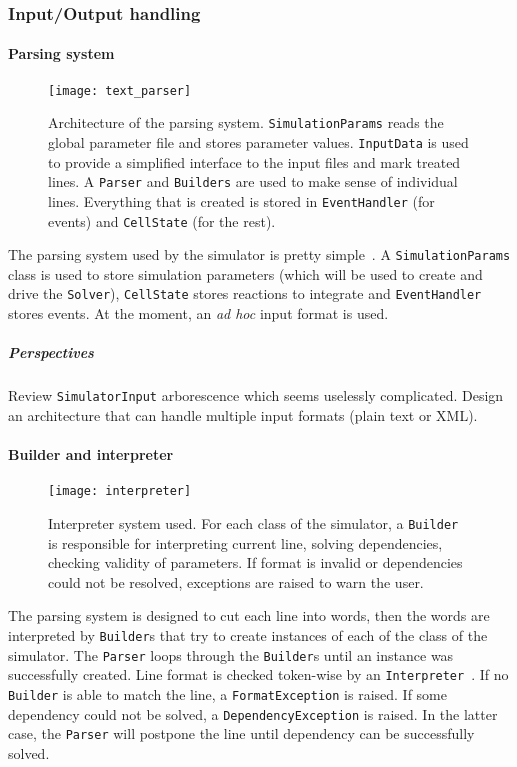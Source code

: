 
\subsubsection{Input/Output handling}

\paragraph{Parsing system}

\begin{figure}[!h]
  \centering
  \texttt{[image: text\_parser]}
  \caption{Architecture of the parsing system. \texttt{SimulationParams} reads the global parameter file and stores parameter values. \texttt{InputData} is used to provide a simplified interface to the input files and mark treated lines. A \texttt{Parser} and \texttt{Builders} are used to make sense of individual lines. Everything that is created is stored in \texttt{EventHandler} (for events) and \texttt{CellState} (for the rest). }
  \label{fig:text_parser}
\end{figure}

The parsing system used by the simulator is pretty simple~. A \texttt{SimulationParams} class is used to store simulation parameters (which will be used to create and drive the \texttt{Solver}), \texttt{CellState} stores reactions to integrate and \texttt{EventHandler} stores events. At the moment, an \textit{ad hoc} input format is used.

\subparagraph{Perspectives} Review \texttt{SimulatorInput} arborescence which seems uselessly complicated. Design an architecture that can handle multiple input formats (plain text or XML).

\paragraph{Builder and interpreter}

\begin{figure}[!h]
  \centering
  \texttt{[image: interpreter]}
  \caption{Interpreter system used. For each class of the simulator, a \texttt{Builder} is responsible for interpreting current line, solving dependencies, checking validity of parameters. If format is invalid or dependencies could not be resolved, exceptions are raised to warn the user.}
  \label{fig:interpreter}
\end{figure}

The parsing system is designed to cut each line into words, then the words are interpreted by \texttt{Builder}s that try to create instances of each of the class of the simulator. The \texttt{Parser} loops through the \texttt{Builder}s until an instance was successfully created. Line format is checked token-wise by an \texttt{Interpreter}~. If no \texttt{Builder} is able to match the line, a \texttt{FormatException} is raised. If some dependency could not be solved, a \texttt{DependencyException} is raised. In the latter case, the \texttt{Parser} will postpone the line until dependency can be successfully solved.

